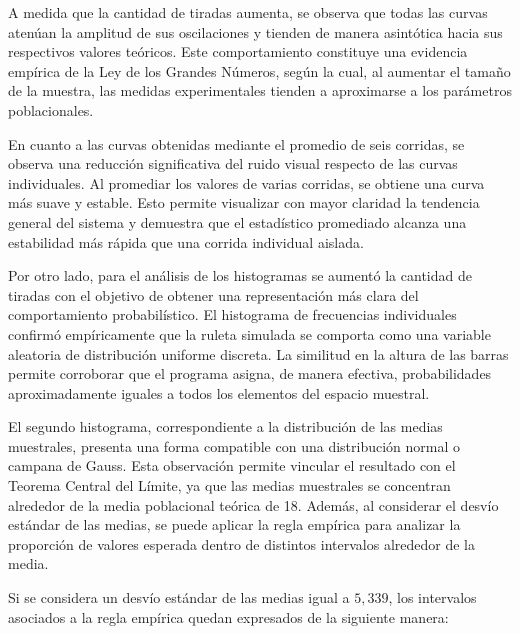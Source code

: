 \documentclass{article}
\begin{document}
A medida que la cantidad de tiradas aumenta, se observa que todas las curvas atenúan la amplitud de sus oscilaciones y tienden de manera asintótica hacia sus respectivos valores teóricos. Este comportamiento constituye una evidencia empírica de la Ley de los Grandes Números, según la cual, al aumentar el tamaño de la muestra, las medidas experimentales tienden a aproximarse a los parámetros poblacionales.

En cuanto a las curvas obtenidas mediante el promedio de seis corridas, se observa una reducción significativa del ruido visual respecto de las curvas individuales. Al promediar los valores de varias corridas, se obtiene una curva más suave y estable. Esto permite visualizar con mayor claridad la tendencia general del sistema y demuestra que el estadístico promediado alcanza una estabilidad más rápida que una corrida individual aislada.

Por otro lado, para el análisis de los histogramas se aumentó la cantidad de tiradas con el objetivo de obtener una representación más clara del comportamiento probabilístico. El histograma de frecuencias individuales confirmó empíricamente que la ruleta simulada se comporta como una variable aleatoria de distribución uniforme discreta. La similitud en la altura de las barras permite corroborar que el programa asigna, de manera efectiva, probabilidades aproximadamente iguales a todos los elementos del espacio muestral.

El segundo histograma, correspondiente a la distribución de las medias muestrales, presenta una forma compatible con una distribución normal o campana de Gauss. Esta observación permite vincular el resultado con el Teorema Central del Límite, ya que las medias muestrales se concentran alrededor de la media poblacional teórica de 18. Además, al considerar el desvío estándar de las medias, se puede aplicar la regla empírica para analizar la proporción de valores esperada dentro de distintos intervalos alrededor de la media.

Si se considera un desvío estándar de las medias igual a $5{,}339$, los intervalos asociados a la regla empírica quedan expresados de la siguiente manera:
\end{document}
